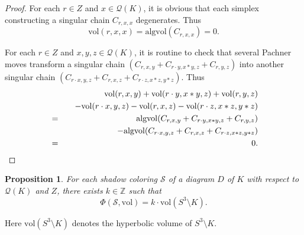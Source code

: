 \documentclass[12pt]{amsart}
\newtheorem{proposition}[theorem]{Proposition}
\theoremstyle{definition}
\begin{document}
\begin{proof}
For each $r \in Z$ and $x \in \mathcal{Q}(K)$, it is obvious that each simplex constructing a singular chain $C_{r, x, x}$ degenerates.
Thus
\[
 \mathrm{vol}(r, x, x) = \mathrm{algvol}(C_{r, x, x}) = 0.
\]

For each $r \in Z$ and $x, y, z \in \mathcal{Q}(K)$, it is routine to check that several Pachner moves transform a singular chain $(C_{r, x, y} + C_{r \cdot y, x \ast y, z} + C_{r, y, z})$ into another singular chain $(C_{r \cdot x, y, z} + C_{r, x, z} + C_{r \cdot z, x \ast z, y \ast z})$.
Thus
\begin{eqnarray*}
 & & \mathrm{vol}(r, x, y) + \mathrm{vol}(r \cdot y, x \ast y, z) + \mathrm{vol}(r, y, z) \\
 & & \hskip 1em - \mathrm{vol}(r \cdot x, y, z) - \mathrm{vol}(r, x, z) - \mathrm{vol}(r \cdot z, x \ast z, y \ast z) \\
 & = & \mathrm{algvol}(C_{r, x, y} + C_{r \cdot y, x \ast y, z} + C_{r, y, z}) \\
 & & \hskip 1em - \mathrm{algvol}(C_{r \cdot x, y, z} + C_{r, x, z} + C_{r \cdot z, x \ast z, y \ast z}) \\
 & = & 0.
\end{eqnarray*}
\end{proof}

\begin{proposition}\label{prop:2_cocycle_P}
For each shadow coloring $\mathcal{S}$ of a diagram $D$ of $K$ with respect to $\mathcal{Q}(K)$ and $Z$, there exists $k \in \mathbb{Z}$ such that
\[
 \Phi(\mathcal{S}, \mathrm{vol}) = k \cdot \mathrm{vol}(S^{3} \setminus K).
\]
\end{proposition}

\noindent
Here $\mathrm{vol}(S^{3} \setminus K)$ denotes the hyperbolic volume of $S^{3} \setminus K$.
\end{document}
